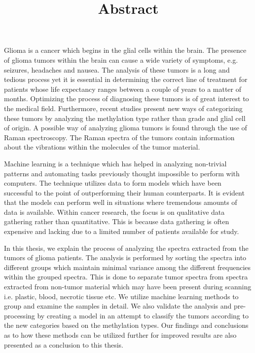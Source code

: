 \title{Abstract}

Glioma is a cancer which begins in the glial cells within the brain. The presence of glioma tumors within the brain can cause a wide variety of symptoms, e.g. seizures, headaches and nausea. The analysis of these tumors is a long and tedious process yet it is essential in determining the correct line of treatment for patients whose life expectancy ranges between a couple of years to a matter of months. Optimizing the process of diagnosing these tumors is of great interest to the medical field. Furthermore, recent studies present new ways of categorizing these tumors by analyzing the methylation type rather than grade and glial cell of origin. A possible way of analyzing glioma tumors is found through the use of Raman spectroscopy. The Raman spectra of the tumors contain information about the vibrations within the molecules of the tumor material.

Machine learning is a technique which has helped in analyzing non-trivial patterns  and automating tasks previously thought impossible to perform with computers. The technique utilizes data to form models which have been successful to the point of outperforming their human counterparts. It is evident that the models can perform well in situations where tremendous amounts of data is available. Within cancer research, the focus is on qualitative data gathering rather than quantitative. This is because data gathering is often expensive and lacking due to a limited number of patients available for study.  

In this thesis, we explain the process of analyzing the spectra extracted from the tumors of glioma patients. The analysis is performed by sorting the spectra into different groups which maintain minimal variance among the different frequencies within the grouped spectra. This is done to separate tumor spectra from spectra extracted from non-tumor material which may have been present during scanning i.e. plastic, blood, necrotic tissue etc. We utilize machine learning methods to group and examine the samples in detail. We also validate the analysis and pre-processing by creating a model in an attempt to classify the tumors according to the new categories based on the methylation types. Our findings and conclusions as to how these methods can be utilized further for improved results are also presented as a conclusion to this thesis.  

